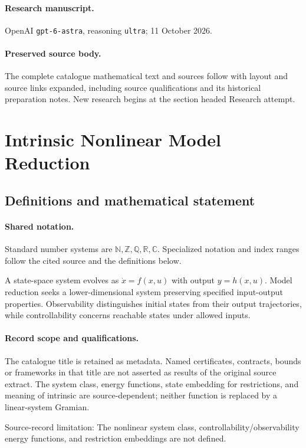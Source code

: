 \documentclass[11pt]{article}
\begin{document}
\paragraph{Research manuscript.} OpenAI \texttt{gpt-6-astra}, reasoning \texttt{ultra}; 11 October 2026.
\paragraph{Preserved source body.} The complete catalogue mathematical text and sources follow with layout and source links expanded, including source qualifications and its historical preparation notes. New research begins at the section headed Research attempt.

\section{Intrinsic Nonlinear Model Reduction}\label{statement}

\subsection{Definitions and mathematical statement}

\paragraph{Shared notation.}Standard number systems are $\mathbb N,\mathbb Z,\mathbb Q,\mathbb R,\mathbb C$. Specialized notation and index ranges follow the cited source and the definitions below.


A state-space system evolves as $\dot x=f(x,u)$ with output $y=h(x,u)$. Model reduction seeks a lower-dimensional system preserving specified input-output properties. Observability distinguishes initial states from their output trajectories, while controllability concerns reachable states under allowed inputs.
\paragraph{Record scope and qualifications.}
The catalogue title is retained as metadata. Named certificates, contracts, bounds or frameworks in that title are not asserted as results of the original source extract.
The system class, energy functions, state embedding for restrictions, and meaning of intrinsic are source-dependent; neither function is replaced by a linear-system Gramian.

Source-record limitation: The nonlinear system class, controllability/observability energy functions, and restriction embeddings are not defined.
\end{document}
